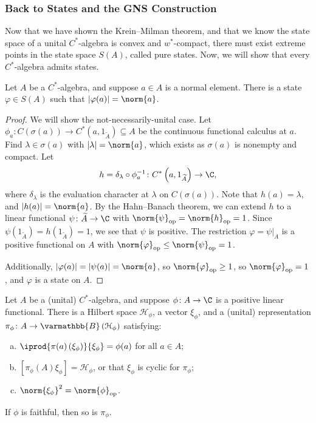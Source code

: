 \documentclass[10pt]{mypackage}
\renewcommand*{\mathbb}[1]{\varmathbb{#1}}
\newcommand{\B}{\mathbb{B}}
\DeclareMathOperator{\op}{op}
\begin{document}
\subsubsection{Back to States and the GNS Construction}%
Now that we have shown the Krein--Milman theorem, and that we know the state space of a unital $C^{\ast}$-algebra is convex and $w^{\ast}$-compact, there must exist extreme points in the state space $S(A)$, called pure states. Now, we will show that every $C^{\ast}$-algebra admits states.
\begin{proposition}
  Let $A$ be a $C^{\ast}$-algebra, and suppose $a\in A$ is a normal element. There is a state $\varphi\in S(A)$ such that $\left\vert \varphi(a) \right\vert = \norm{a}$.
\end{proposition}
\begin{proof}
  We will show the not-necessarily-unital case. Let $\phi_a\colon C\left(\sigma\left(a\right)\right)\rightarrow C^{\ast}\left(a,1_{\widetilde{A}}\right)\subseteq A$ be the continuous functional calculus at $a$. Find $\lambda\in \sigma(a)$ with $\left\vert \lambda \right\vert = \norm{a}$, which exists as $\sigma(a)$ is nonempty and compact. Let
  \begin{align*}
    h = \delta_{\lambda}\circ \phi_a^{-1}\colon C^{\ast}\left(a,1_{\widetilde{A}}\right) \rightarrow \C,
  \end{align*}
  where $\delta_{\lambda}$ is the evaluation character at $\lambda$ on $C\left(\sigma\left(a\right)\right)$. Note that $h(a) = \lambda$, and $\left\vert h(a) \right\vert = \norm{a}$. By the Hahn--Banach theorem, we can extend $h$ to a linear functional $\psi\colon \widetilde{A}\rightarrow \C$ with $\norm{\psi}_{\op} = \norm{h}_{\op} = 1$. Since $\psi\left(1_{\widetilde{A}}\right) = h\left(1_{\widetilde{A}}\right) = 1$, we see that $\psi$ is positive. The restriction $\varphi = \psi|_{A}$ is a positive functional on $A$ with $\norm{\varphi}_{\op} \leq \norm{\psi}_{\op} = 1$.\newline

  Additionally, $\left\vert \varphi(a) \right\vert = \left\vert \psi(a) \right\vert = \norm{a}$, so $\norm{\varphi}_{\op}\geq 1$, so $\norm{\varphi}_{\op} = 1$, and $\varphi$ is a state on $A$.
\end{proof}
\begin{theorem}
  Let $A$ be a (unital) $C^{\ast}$-algebra, and suppose $\phi\colon A\rightarrow \C$ is a positive linear functional. There is a Hilbert space $\mathcal{H}_{\phi}$, a vector $\xi_{\phi}$, and a (unital) representation $\pi_{\phi}\colon A\rightarrow \B\left(\mathcal{H}_{\phi}\right)$ satisfying:
  \begin{enumerate}[(a)]
    \item $ \iprod{\pi(a)\left(\xi_{\phi}\right)}{\xi_{\phi}} = \phi(a) $ for all $a\in A$;
    \item $\left[\pi_{\phi}(A)\xi_{\phi}\right] = \mathcal{H}_{\phi}$, or that $\xi_{\phi}$ is cyclic for $\pi_{\phi}$;
    \item $\norm{\xi_{\phi}}^2 = \norm{\phi}_{\op}$.
  \end{enumerate}
  If $\phi$ is faithful, then so is $\pi_{\phi}$.
\end{theorem}
\end{document}
